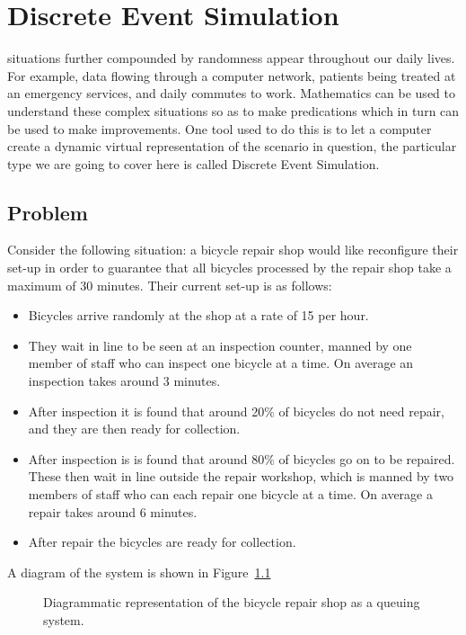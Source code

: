 \chapter[Discrete Event Simulation]{Discrete Event Simulation}

 situations further compounded by randomness appear
throughout our daily lives. For example, data flowing through a computer
network, patients being treated at an emergency services, and daily commutes to
work.
Mathematics can be used to understand these complex situations so as to
make predications which in turn can be used to make improvements. One tool used
to do this is to let a computer create a dynamic virtual representation of the
scenario in question, the particular type we are going to cover here is called
Discrete Event Simulation.

\section{Problem}\label{sec:problem}

Consider the following situation: a bicycle repair shop would like reconfigure
their set-up in order to guarantee that all bicycles processed by the repair
shop take a maximum of 30 minutes.
Their current set-up is as follows:

\begin{itemize}
  \item Bicycles arrive randomly at the shop at a rate of 15 per hour.
  \item They wait in line to be seen at an inspection counter, manned by one
  member of staff who can inspect one bicycle at a time. On average an
  inspection takes around 3 minutes.
  \item After inspection it is found that around 20\% of bicycles do not need
  repair, and they are then ready for collection.
  \item After inspection is is found that around 80\% of bicycles go on to be
  repaired. These then wait in line outside the repair workshop, which is manned
  by two members of staff who can each repair one bicycle at a time. On average
  a repair takes around 6 minutes.
  \item After repair the bicycles are ready for collection.
\end{itemize}

A diagram of the system is shown in Figure~\ref{fig:bike-shop}

\begin{figure}
\begin{center}

\end{center}
\caption{Diagrammatic representation of the bicycle repair shop as a queuing system.}
\label{fig:bike-shop}
\end{figure}

